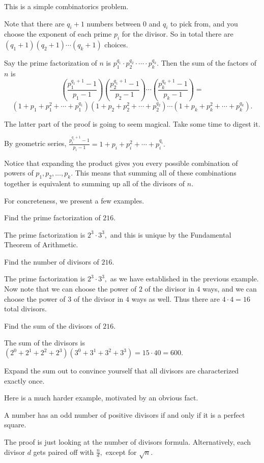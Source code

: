 \documentclass[blue,onecol]{shooting}
\begin{document}
\begin{pro}
This is a simple combinatorics problem.

Note that there are $q_i+1$ numbers between $0$ and $q_i$ to pick from, and you choose the exponent of each prime $p_i$ for the divisor. So in total there are $(q_1+1)(q_2+1)\cdots(q_k+1)$ choices.
\end{pro}

\begin{theo}
Say the prime factorization of $n$ is $p_1^{q_1}\cdot p_2^{q_2}\cdot\cdots\cdot p_k^{q_k}.$ Then the sum of the factors of $n$ is
\[\left(\frac{p_1^{q_1+1}-1}{p_1-1}\right)\left(\frac{p_2^{q_1+1}-1}{p_2-1}\right)\cdots\left(\frac{p_k^{q_k+1}-1}{p_k-1}\right)=\]
\[\left(1+p_1+p_1^2+\cdots+p_1^{q_1}\right)\left(1+p_2+p_2^2+\cdots+p_2^{q_2}\right)\cdots\left(1+p_k+p_k^2+\cdots+p_k^{q_k}\right).\]
\end{theo}
The latter part of the proof is going to seem magical. Take some time to digest it.

\begin{pro}
By geometric series, $\frac{p_i^{q_i+1}-1}{p_i-1}=1+p_i+p_i^2+\cdots+p_i^{q_i}.$

Notice that expanding the product gives you every possible combination of powers of $p_1,p_2,\ldots,p_k.$ This means that summing all of these combinations together is equivalent to summing up all of the divisors of $n.$
\end{pro}

For concreteness, we present a few examples.
\begin{exam}
Find the prime factorization of $216.$
\end{exam}
\begin{sol}
The prime factorization is $2^3\cdot 3^3,$ and this is unique by the Fundamental Theorem of Arithmetic.
\end{sol}
\begin{exam}
Find the number of divisors of $216.$
\end{exam}
\begin{sol}
The prime factorization is $2^3\cdot 3^3,$ as we have established in the previous example. Now note that we can choose the power of $2$ of the divisor in $4$ ways, and we can choose the power of $3$ of the divisor in $4$ ways as well. Thus there are $4\cdot 4=16$ total divisors.
\end{sol}
\begin{exam}
Find the sum of the divisors of $216.$
\end{exam}
\begin{sol}
The sum of the divisors is $(2^0+2^1+2^2+2^3)(3^0+3^1+3^2+3^3)=15\cdot 40=600.$

Expand the sum out to convince yourself that all divisors are characterized exactly once.
\end{sol}
Here is a much harder example, motivated by an obvious fact.
\begin{fact}
A number has an odd number of positive divisors if and only if it is a perfect square.
\end{fact}
The proof is just looking at the number of divisors formula. Alternatively, each divisor $d$ gets paired off with $\frac{n}{d},$ except for $\sqrt{n}.$
\end{document}
